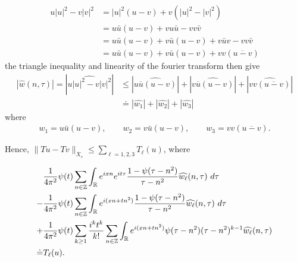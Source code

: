 \documentclass[handout]{beamer}
\numberwithin{equation}{section}
\newcommand{\rr}{\mathbb{R}}
\newcommand{\zz}{\mathbb{Z}}
\newcommand{\wh}{\widehat}
\begin{document}
\begin{frame}
%
\begin{equation*}
	\begin{split}
		u | u |^{2} - v | v |^{2}
		& = | u |^2 \left( u -v \right) + v\left( | u 
		|^2 - | v |^2
		\right)
		\\
		& = u \bar u \left( u -v \right) + v u \bar u - v v \bar v
		\\
		& = u \bar u \left( u - v \right) + v \bar u\left( u - v \right) + v 
		\bar u v - v v \bar v
		\\
		& = u \bar u \left( u -v \right) + v \bar u\left( u - v \right) + v v 
		\left( \overline{u -v} \right)
	\end{split}
\end{equation*}
%
the triangle inequality and linearity of the fourier transform then give
%
\begin{equation*}
	\begin{split}
		| \wh{w}(n, \tau) | = | \wh{u | u |^2 - v| v |^2} |
		& \le | \wh{u \overline{u} \left (u -v \right )} | +
		| \wh{v \overline{u} (u -v)} | + |\wh{v v 
		(\overline{u-v})}|
		\\
		& \doteq | \wh{w_1} | + | \wh{w_2} | + | \wh{w_3} |
	\end{split}
\end{equation*}
%
where
%
\begin{equation*}
	\begin{split}
		w_1 = u \bar u \left( u -v \right), \qquad w_2 = v \bar u \left( u -v 
		\right), \qquad w_3 = v v \left( \overline{u -v} \right).
	\end{split}
\end{equation*}
%
\end{frame}


\begin{frame}
Hence, $\|Tu - Tv\|_{X_s} \le \sum_{\ell=1, 2, 3} 
T_\ell(u)$, where



\begin{align}
	\label{main-int-exp-mod1}
	& \frac{1}{4 \pi^2} \psi(t) \sum_{n\in \zz} \int_\rr e^{ixn}  
		e^{it \tau} \frac{ 1 - \psi(\tau - n^{2}) 
		}{\tau - n^{2}} \wh{w_\ell}(n, \tau) \ d \tau
		\\
		\label{main-int-exp-mod2}
		- & \frac{1}{4 \pi^2} \psi(t) \sum_{n\in \zz} \int_\rr e^{i(xn + 
		tn^{2})}
		 \frac{1- \psi(\tau - n^{2})}{\tau - n^{2}} \wh{w_\ell}(n, \tau) \ d \tau
		\\
		\label{main-int-exp-mod3}
		+ & \frac{1}{4 \pi^2} \psi(t) \sum_{k \ge 1} \frac{i^k t^k}{k!}
		\sum_{n \in \zz} \int_\rr e^{i(xn + tn^{2} )}
		\psi(\tau - n^{2}) (\tau - n^{2})^{k-1} \wh{w_\ell}(n, \tau)  
		\\
		\doteq & T_\ell(u). \notag
\end{align}

\end{frame}
\end{document}
